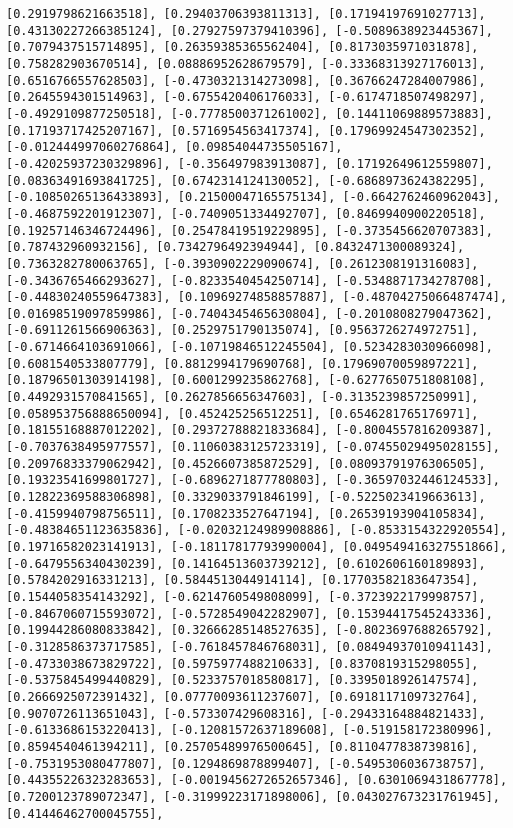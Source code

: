 \documentclass[11pt]{article}
\begin{document}
\begin{Verbatim}[commandchars=\\\{\}]
[0.2919798621663518], [0.29403706393811313], [0.17194197691027713], [0.43130227266385124], [0.27927597379410396], [-0.5089638923445367], [0.7079437515714895], [0.26359385365562404], [0.8173035971031878], [0.758282903670514], [0.08886952628679579], [-0.33368313927176013], [0.6516766557628503], [-0.4730321314273098], [0.36766247284007986], [0.2645594301514963], [-0.6755420406176033], [-0.6174718507498297], [-0.4929109877250518], [-0.7778500371261002], [0.14411069889573883], [0.17193717425207167], [0.5716954563417374], [0.17969924547302352], [-0.012444997060276864], [0.09854044735505167], [-0.42025937230329896], [-0.356497983913087], [0.17192649612559807], [0.08363491693841725], [0.6742314124130052], [-0.6868973624382295], [-0.10850265136433893], [0.21500047165575134], [-0.6642762460962043], [-0.4687592201912307], [-0.7409051334492707], [0.8469940900220518], [0.19257146346724496], [0.25478419519229895], [-0.3735456620707383], [0.787432960932156], [0.7342796492394944], [0.8432471300089324], [0.7363282780063765], [-0.3930902229090674], [0.2612308191316083], [-0.3436765466293627], [-0.8233540454250714], [-0.5348871734278708], [-0.44830240559647383], [0.10969274858857887], [-0.48704275066487474], [0.01698519097859986], [-0.7404345465630804], [-0.2010808279047362], [-0.6911261566906363], [0.2529751790135074], [0.9563726274972751], [-0.6714664103691066], [-0.10719846512245504], [0.5234283030966098], [0.6081540533807779], [0.8812994179690768], [0.17969070059897221], [0.18796501303914198], [0.6001299235862768], [-0.6277650751808108], [0.4492931570841565], [0.2627856656347603], [-0.3135239857250991], [0.058953756888650094], [0.452425256512251], [0.6546281765176971], [0.18155168887012202], [0.29372788821833684], [-0.8004557816209387], [-0.7037638495977557], [0.11060383125723319], [-0.07455029495028155], [0.20976833379062942], [0.4526607385872529], [0.08093791976306505], [0.19323541699801727], [-0.6896271877780803], [-0.36597032446124533], [0.12822369588306898], [0.3329033791846199], [-0.5225023419663613], [-0.4159940798756511], [0.1708233527647194], [0.26539193904105834], [-0.48384651123635836], [-0.02032124989908886], [-0.8533154322920554], [0.19716582023141913], [-0.18117817793990004], [0.049549416327551866], [-0.6479556340430239], [0.14164513603739212], [0.6102606160189893], [0.5784202916331213], [0.5844513044914114], [0.17703582183647354], [0.1544058354143292], [-0.6214760549808099], [-0.3723922179998757], [-0.8467060715593072], [-0.5728549042282907], [0.15394417545243336], [0.19944286080833842], [0.32666285148527635], [-0.8023697688265792], [-0.3128586373717585], [-0.7618457846768031], [0.08494937010941143], [-0.4733038673829722], [0.5975977488210633], [0.8370819315298055], [-0.5375845499440829], [0.5233757018580817], [0.3395018926147574], [0.2666925072391432], [0.07770093611237607], [0.6918117109732764], [0.9070726113651043], [-0.573307429608316], [-0.29433164884821433], [-0.6133686153220413], [-0.12081572637189608], [-0.519158172380996], [0.8594540461394211], [0.25705489976500645], [0.8110477838739816], [-0.7531953080477807], [0.1294869878899407], [-0.5495306036738757], [0.44355226323283653], [-0.0019456272652657346], [0.6301069431867778], [0.7200123789072347], [-0.31999223171898006], [0.043027673231761945], [0.41446462700045755], 
\end{Verbatim}
\end{document}
